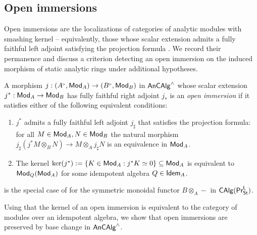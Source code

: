 \subsection{Open immersions}\label{subsec: open immersions}
Open immersions are the localizations of categories of analytic modules with smashing kernel -- equivalently, those whose scalar extension admits a fully faithful left adjoint satisfying the projection formula \cite[Prop. 6.5]{Complex}. We record their permanence and discuss a criterion detecting an open immersion on the induced morphism of static analytic rings under additional hypotheses.
\begin{definition}\label{def: open immersion}
    A morphism $j:(A^{\tri},\Mod_{A})\to(B^{\tri},\Mod_{B})$ in $\mathsf{An}\mathsf{CAlg}^{\wedge}$ whose scalar extension $j^{*}:\mathsf{Mod}_{A}\to\mathsf{Mod}_{B}$ has fully faithful right adjoint $j_{*}$ is an \emph{open immersion} if it satisfies either of the following equivalent conditions:
    \begin{enumerate}[label=(\alph*)]
        \item $j^{*}$ admits a fully faithful left adjoint $j_{\sharp}$ that satisfies the projection formula: for all $M\in\mathsf{Mod}_{A},N\in\mathsf{Mod}_{B}$ the natural morphism $j_{\sharp}(j^{*}M\otimes_{B}N)\to M\otimes_{A}j_{\sharp}N$ is an equivalence in $\mathsf{Mod}_{A}$. 
        \item The kernel $\ker(j^{*}):=\{K\in\mathsf{Mod}_{A}:j^{*}K\simeq0\}\subseteq\mathsf{Mod}_{A}$ is equivalent to $\mathsf{Mod}_{Q}(\mathsf{Mod}_{A})$ for some idempotent algebra $Q\in\mathsf{Idem}_{A}$.
    \end{enumerate}
\end{definition}
\begin{remark}\label{rmk: open immersion as categorical open immersion}
     is the special case of  for the symmetric monoidal functor $B\otimes_{A}-$ in $\mathsf{CAlg}(\mathsf{Pr}^{\mathsf{L}}_{\mathsf{St}})$.
\end{remark}
Using that the kernel of an open immersion is equivalent to the category of modules over an idempotent algebra, we show that open immersions are preserved by base change in $\mathsf{An}\mathsf{CAlg}^{\wedge}$. 
